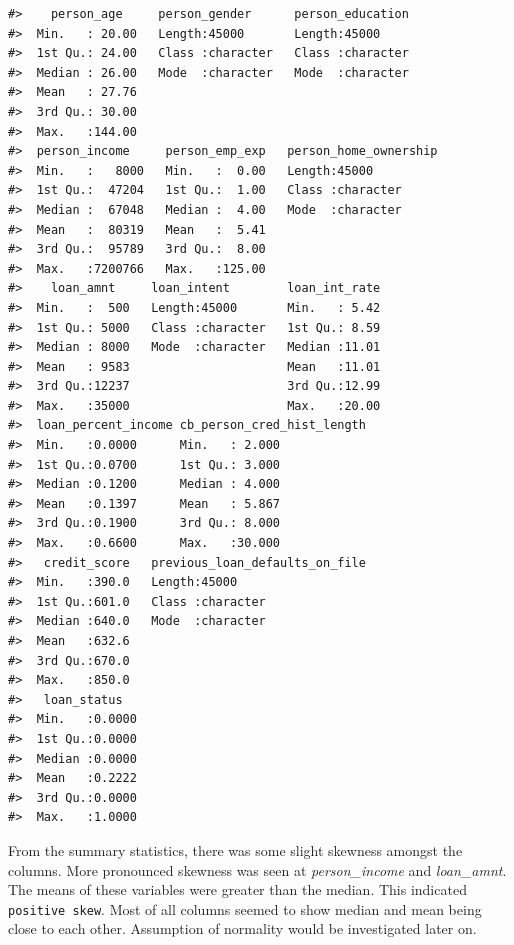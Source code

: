 \documentclass[
  10pt,
]{article}
\begin{document}
\begin{verbatim}
#>    person_age     person_gender      person_education  
#>  Min.   : 20.00   Length:45000       Length:45000      
#>  1st Qu.: 24.00   Class :character   Class :character  
#>  Median : 26.00   Mode  :character   Mode  :character  
#>  Mean   : 27.76                                        
#>  3rd Qu.: 30.00                                        
#>  Max.   :144.00                                        
#>  person_income     person_emp_exp   person_home_ownership
#>  Min.   :   8000   Min.   :  0.00   Length:45000         
#>  1st Qu.:  47204   1st Qu.:  1.00   Class :character     
#>  Median :  67048   Median :  4.00   Mode  :character     
#>  Mean   :  80319   Mean   :  5.41                        
#>  3rd Qu.:  95789   3rd Qu.:  8.00                        
#>  Max.   :7200766   Max.   :125.00                        
#>    loan_amnt     loan_intent        loan_int_rate  
#>  Min.   :  500   Length:45000       Min.   : 5.42  
#>  1st Qu.: 5000   Class :character   1st Qu.: 8.59  
#>  Median : 8000   Mode  :character   Median :11.01  
#>  Mean   : 9583                      Mean   :11.01  
#>  3rd Qu.:12237                      3rd Qu.:12.99  
#>  Max.   :35000                      Max.   :20.00  
#>  loan_percent_income cb_person_cred_hist_length
#>  Min.   :0.0000      Min.   : 2.000            
#>  1st Qu.:0.0700      1st Qu.: 3.000            
#>  Median :0.1200      Median : 4.000            
#>  Mean   :0.1397      Mean   : 5.867            
#>  3rd Qu.:0.1900      3rd Qu.: 8.000            
#>  Max.   :0.6600      Max.   :30.000            
#>   credit_score   previous_loan_defaults_on_file
#>  Min.   :390.0   Length:45000                  
#>  1st Qu.:601.0   Class :character              
#>  Median :640.0   Mode  :character              
#>  Mean   :632.6                                 
#>  3rd Qu.:670.0                                 
#>  Max.   :850.0                                 
#>   loan_status    
#>  Min.   :0.0000  
#>  1st Qu.:0.0000  
#>  Median :0.0000  
#>  Mean   :0.2222  
#>  3rd Qu.:0.0000  
#>  Max.   :1.0000
\end{verbatim}

From the summary statistics, there was some slight skewness amongst the
columns. More pronounced skewness was seen at \emph{person\_income} and
\emph{loan\_amnt}. The means of these variables were greater than the
median. This indicated \texttt{positive\ skew}. Most of all columns
seemed to show median and mean being close to each other. Assumption of
normality would be investigated later on.\\
\end{document}

